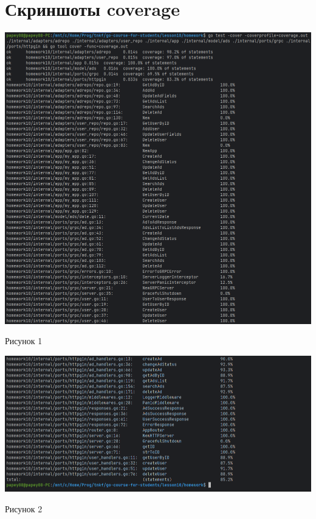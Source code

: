 \documentclass[12pt]{article}
\begin{document}
    \section*{Скриншоты coverage}

    \begin{center}
        \includegraphics[scale=0.8]{screenshot01}
    \end{center}
    \begin{center}
        Рисунок 1
    \end{center}

    \begin{center}
        \includegraphics[scale=0.8]{screenshot02}
    \end{center}
    \begin{center}
        Рисунок 2
    \end{center}
\end{document}
